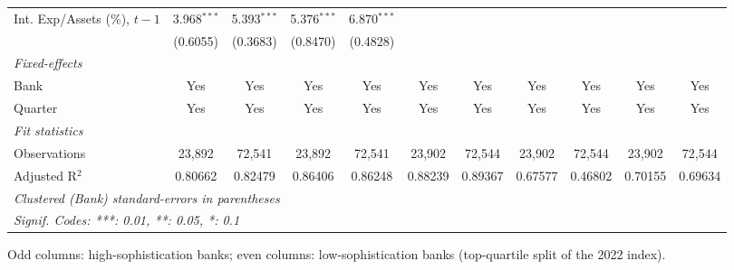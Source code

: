 \begin{tabular}{lcccccccccc}
   Int. Exp/Assets (\%), $t{-}1$  & 3.968$^{***}$   & 5.393$^{***}$   & 5.376$^{***}$   & 6.870$^{***}$   &                &                &                 &          &                &   \\   
                                  & (0.6055)        & (0.3683)        & (0.8470)        & (0.4828)        &                &                &                 &          &                &   \\   
   \midrule
   \emph{Fixed-effects}\\
   Bank                           & Yes             & Yes             & Yes             & Yes             & Yes            & Yes            & Yes             & Yes      & Yes            & Yes\\  
   Quarter                        & Yes             & Yes             & Yes             & Yes             & Yes            & Yes            & Yes             & Yes      & Yes            & Yes\\  
   \midrule
   \emph{Fit statistics}\\
   Observations                   & 23,892          & 72,541          & 23,892          & 72,541          & 23,902         & 72,544         & 23,902          & 72,544   & 23,902         & 72,544\\  
   Adjusted R$^2$                 & 0.80662         & 0.82479         & 0.86406         & 0.86248         & 0.88239        & 0.89367        & 0.67577         & 0.46802  & 0.70155        & 0.69634\\  
   \midrule \midrule
   \multicolumn{11}{l}{\emph{Clustered (Bank) standard-errors in parentheses}}\\
   \multicolumn{11}{l}{\emph{Signif. Codes: ***: 0.01, **: 0.05, *: 0.1}}\\
\end{tabular}
 
\par \raggedright 
Odd columns: high-sophistication banks; even columns: low-sophistication banks (top-quartile split of the 2022 index).
\par\endgroup


